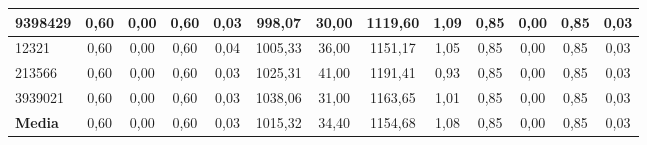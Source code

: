 \documentclass[12pt, spanish]{article}
\begin{document}
\begin{table}[H]
\begin{adjustwidth}{-1cm}{-1cm}
\begin{tabular}{|l|c|c|c|c|c|c|c|c|c|c|c|c|}
9398429                                                 & 0,60                         & 0,00                           & 0,60                      & 0,03                   & 998,07                       & 30,00                          & 1119,60                   & 1,09                   & 0,85                         & 0,00                           & 0,85                      & 0,03                   \\ \hline
12321                                                   & 0,60                         & 0,00                           & 0,60                      & 0,04                   & 1005,33                      & 36,00                          & 1151,17                   & 1,05                   & 0,85                         & 0,00                           & 0,85                      & 0,03                   \\ \hline
213566                                                  & 0,60                         & 0,00                           & 0,60                      & 0,03                   & 1025,31                      & 41,00                          & 1191,41                   & 0,93                   & 0,85                         & 0,00                           & 0,85                      & 0,03                   \\ \hline
3939021                                                 & 0,60                         & 0,00                           & 0,60                      & 0,03                   & 1038,06                      & 31,00                          & 1163,65                   & 1,01                   & 0,85                         & 0,00                           & 0,85                      & 0,03                   \\ \hline
\textbf{Media}                                          & 0,60                         & 0,00                           & 0,60                      & 0,03                   & 1015,32                      & 34,40                          & 1154,68                   & 1,08                   & 0,85                         & 0,00                           & 0,85                      & 0,03                   \\ \hline
\end{tabular}

\end{adjustwidth}

\end{table}	
\end{document}
